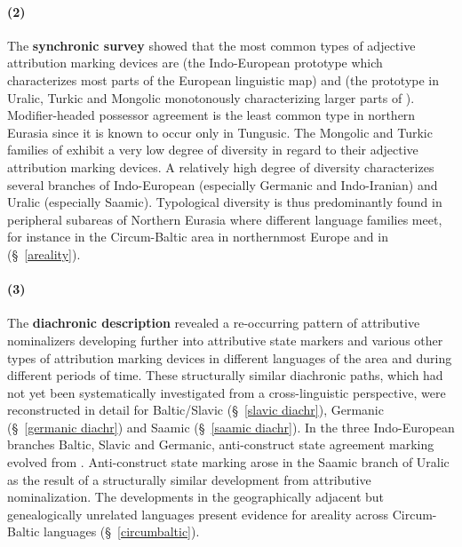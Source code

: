 \paragraph{(2)}
The \textbf{synchronic survey} showed that the most common types of adjective attribution marking devices are  (the Indo\hyp{}European prototype which characterizes most parts of the European linguistic map) and  (the prototype in Uralic, Turkic and Mongolic monotonously characterizing larger parts of ). Modifier\hyp{}headed possessor agreement is the least common type in northern Eurasia since it is known to occur only in Tungusic. The Mongolic and Turkic families of  exhibit a very low degree of diversity in regard to their adjective attribution marking devices. A relatively high degree of diversity characterizes several branches of Indo-European (especially Germanic and Indo-Iranian) and Uralic (especially Saamic). Typological diversity is thus predominantly found in peripheral subareas of Northern Eurasia where different language families meet, for instance in the Circum-Baltic area in northernmost Europe and in  (\S~\ref{areality}).

\paragraph{(3)}
The \textbf{diachronic description} revealed a re-occurring pattern of attributive nominalizers developing further into attributive state markers and various other types of attribution marking devices in different languages of the area and during different periods of time. These structurally similar diachronic paths, which had not yet been systematically investigated from a cross-linguistic perspective, were reconstructed in detail for Baltic\slash{}Slavic (\S~\ref{slavic diachr}), Germanic (\S~\ref{germanic diachr}) and Saamic (\S~\ref{saamic diachr}). In the three Indo-European branches Baltic, Slavic and Germanic, anti\hyp{}construct state agreement marking evolved from . Anti\hyp{}construct state marking arose in the Saamic branch of Uralic as the result of a structurally similar development from attributive nominalization. The developments in the geographically adjacent but genealogically unrelated languages present evidence for areality across Circum-Baltic languages (\S~\ref{circumbaltic}).\\

